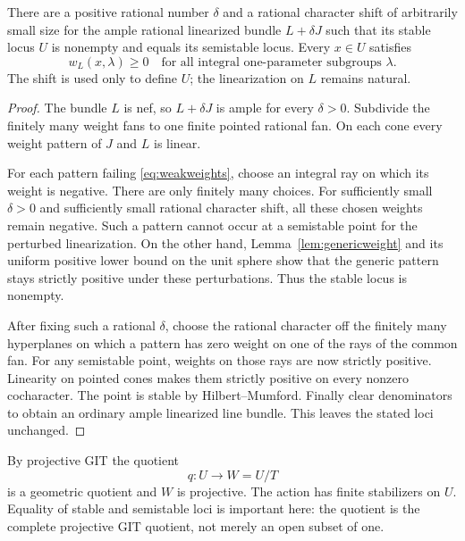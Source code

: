 \begin{proposition}\label{prop:stableopen}
There are a positive rational number $\delta$ and a rational character shift of arbitrarily small size for the ample rational linearized bundle $L+\delta J$ such that its stable locus $U$ is nonempty and equals its semistable locus. Every $x\in U$ satisfies
\begin{equation}\label{eq:weakweights}
w_L(x,\lambda)\ge0
\quad\text{for all integral one-parameter subgroups }\lambda.
\end{equation}
The shift is used only to define $U$; the linearization on $L$ remains natural.
\end{proposition}
\begin{proof}
The bundle $L$ is nef, so $L+\delta J$ is ample for every $\delta>0$. Subdivide the finitely many weight fans to one finite pointed rational fan. On each cone every weight pattern of $J$ and $L$ is linear.

For each pattern failing \eqref{eq:weakweights}, choose an integral ray on which its weight is negative. There are only finitely many choices. For sufficiently small $\delta>0$ and sufficiently small rational character shift, all these chosen weights remain negative. Such a pattern cannot occur at a semistable point for the perturbed linearization. On the other hand, Lemma~\ref{lem:genericweight} and its uniform positive lower bound on the unit sphere show that the generic pattern stays strictly positive under these perturbations. Thus the stable locus is nonempty.

After fixing such a rational $\delta$, choose the rational character off the finitely many hyperplanes on which a pattern has zero weight on one of the rays of the common fan. For any semistable point, weights on those rays are now strictly positive. Linearity on pointed cones makes them strictly positive on every nonzero cocharacter. The point is stable by Hilbert--Mumford. Finally clear denominators to obtain an ordinary ample linearized line bundle. This leaves the stated loci unchanged.
\end{proof}

By projective GIT the quotient
\begin{equation}\label{eq:quotient}
q:U\longrightarrow W=U/T
\end{equation}
is a geometric quotient and $W$ is projective. The action has finite stabilizers on $U$. Equality of stable and semistable loci is important here: the quotient is the complete projective GIT quotient, not merely an open subset of one.


